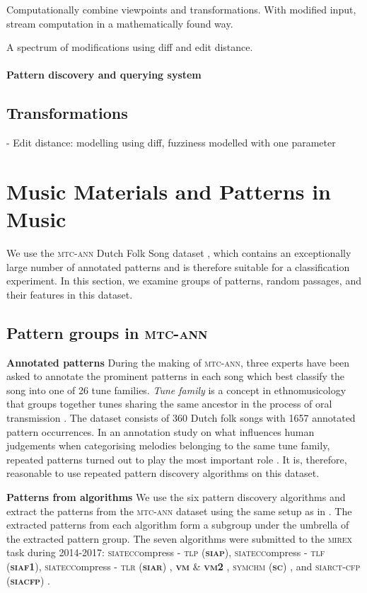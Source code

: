 \documentclass[acmsmall,review,anonymous]{acmart}\settopmatter{printfolios=true,printccs=false,printacmref=false}
\begin{document}
Computationally combine viewpoints and transformations. With modified input,
stream computation in a mathematically found way. 

A spectrum of modifications using diff and edit distance.

\paragraph{Pattern discovery and querying system}

\subsection{Transformations}
- Edit distance: modelling using diff, fuzziness modelled with one parameter

\section{Music Materials and Patterns in Music}
We use the \textsc{mtc-ann} Dutch Folk Song dataset \cite{van2016meertens}, which contains an exceptionally large number of annotated patterns and is therefore suitable for a classification experiment. In this section, we examine groups of patterns, random passages, and their features in this dataset.

\vspace{-1mm}
\subsection{Pattern groups in \textsc{mtc-ann}}\label{sec:es}
\textbf{Annotated patterns}
During the making of \textsc{mtc-ann}, three experts have been asked to annotate the prominent patterns in each song which best classify the song into one of 26 tune families. \textit{Tune family} is a concept in ethnomusicology that groups together tunes sharing the same ancestor in the process of oral transmission \cite{10.2307/851236}. The dataset consists of 360 Dutch folk songs with 1657 annotated pattern occurrences. In an annotation study on what influences human judgements when categorising melodies belonging to the same tune family, repeated patterns turned out to play the most important role \cite{volk2012melodic}. It is, therefore, reasonable to use repeated pattern discovery algorithms on this dataset.

\textbf{Patterns from algorithms}
We use the six pattern discovery algorithms and extract the patterns from the \textsc{mtc-ann} dataset using the same setup as in \cite{ren2017search,boot2016evaluating}. The extracted patterns from each algorithm form a subgroup under the umbrella of the extracted pattern group. The seven algorithms were submitted to the \textsc{mirex} task during 2014-2017: \textsc{siatecc}ompress - \textsc{tlp} (\textbf{\textsc{siap}}), \textsc{siatecc}ompress - \textsc{tlf} (\textbf{\textsc{siaf1}}), \textsc{siatecc}ompress - \textsc{tlr} (\textbf{\textsc{siar}}) \cite{meredith2016using}, \textbf{\textsc{vm}} \& \textbf{\textsc{vm2}} \cite{velarde2014wavelet}, \textsc{symchm} (\textbf{\textsc{sc}}) \cite{pesek2015symchm}, and \textsc{siarct-cfp} (\textbf{\textsc{siacfp}}) \cite{collins2013siarct}.
\end{document}
